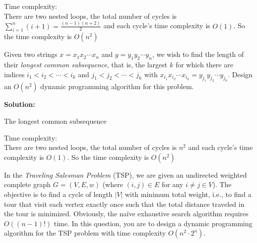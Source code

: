 \documentclass{oxmathproblems}
\begin{document}
\begin{questions}
Time complexity:\\
There are two nested loops, the total number of cycles is $\sum_{i=1}^{n}{(i+1)} = \frac{(n-1)(n+2)}{2}$ and each cycle's time complexity is $O(1)$. So the time complexity is $O(n^2)$

\miquestion[30]
Given two strings $x=x_1x_2\cdots x_n$ and $y=y_1y_2\cdots y_n$, we wish to find the length of their \emph{longest common subsequence}, that is, the largest $k$ for which there are indices $i_1<i_2<\cdots <i_k$ and $j_1<j_2<\cdots<j_k$ with $x_{i_1}x_{i_2}\cdots x_{i_k}=y_{j_1}y_{j_2}\cdots y_{j_k}$. Design an $O(n^2)$ dynamic programming algorithm for this problem.

\textbf{Solution:}

\begin{breakablealgorithm}
  \caption{The longest common subsequence}
  \begin{algorithmic}[1]
      \ELSE
      \ENDIF
      \ENDIF
      \ENDFOR
      \ENDFOR
  \end{algorithmic}
\end{breakablealgorithm}

Time complexity:\\
There are two nested loops, the total number of cycles is $n^2$ and each cycle's time complexity is $O(1)$. So the time complexity is $O(n^2)$

\miquestion[40]
In the \emph{Traveling Salesman Problem} (TSP), we are given an undirected weighted complete graph $G=(V,E,w)$ (where $(i,j)\in E$ for any $i\neq j\in V$). The objective is to find a cycle of length $|V|$ with minimum total weight, i.e., to find a tour that visit each vertex exactly once such that the total distance traveled in the tour is minimized.
Obviously, the na\"ive exhaustive search algorithm requires $O((n-1)!)$ time.
In this question, you are to design a dynamic programming algorithm for the TSP problem with time complexity $O(n^2\cdot 2^n)$.
\end{questions}
\end{document}
